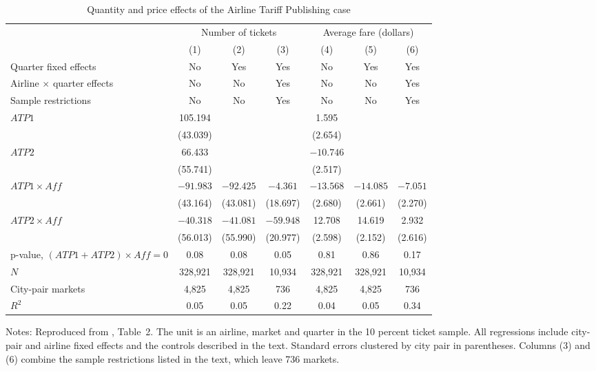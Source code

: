 \begin{table}[htbp]
\centering
\caption{Quantity and price effects of the Airline Tariff Publishing case}\label{tab:13-miller-t2}
\small
\begin{tabular}{@{}lcccccc@{}}
\toprule
 & \multicolumn{3}{c}{Number of tickets} & \multicolumn{3}{c}{Average fare (dollars)}\\
\cmidrule(lr){2-4}\cmidrule(l){5-7}
 & (1) & (2) & (3) & (4) & (5) & (6)\\
\midrule
Quarter fixed effects & No & Yes & Yes & No & Yes & Yes\\
Airline $\times$ quarter effects & No & No & Yes & No & No & Yes\\
Sample restrictions & No & No & Yes & No & No & Yes\\
\addlinespace
$\mathit{ATP1}$ & 105.194 & & & 1.595 & & \\
 & (43.039) & & & (2.654) & & \\
$\mathit{ATP2}$ & 66.433 & & & $-10.746$ & & \\
 & (55.741) & & & (2.517) & & \\
$\mathit{ATP1}\times\mathit{Aff}$ & $-91.983$ & $-92.425$ & $-4.361$ & $-13.568$ & $-14.085$ & $-7.051$\\
 & (43.164) & (43.081) & (18.697) & (2.680) & (2.661) & (2.270)\\
$\mathit{ATP2}\times\mathit{Aff}$ & $-40.318$ & $-41.081$ & $-59.948$ & 12.708 & 14.619 & 2.932\\
 & (56.013) & (55.990) & (20.977) & (2.598) & (2.152) & (2.616)\\
\addlinespace
p-value, $(\mathit{ATP1} + \mathit{ATP2})\times\mathit{Aff} = 0$ & 0.08 & 0.08 & 0.05 & 0.81 & 0.86 & 0.17\\
$N$ & 328{,}921 & 328{,}921 & 10{,}934 & 328{,}921 & 328{,}921 & 10{,}934\\
City-pair markets & 4{,}825 & 4{,}825 & 736 & 4{,}825 & 4{,}825 & 736\\
$R^2$ & 0.05 & 0.05 & 0.22 & 0.04 & 0.05 & 0.34\\
\bottomrule
\end{tabular}

\smallskip
\begin{minipage}{0.95\textwidth}\footnotesize
Notes: Reproduced from \citet{Miller2010}, Table~2. The unit is an airline, market and quarter in the
10 percent ticket sample. All regressions include city-pair and airline fixed effects and the controls described
in the text. Standard errors clustered by city pair in parentheses. Columns (3) and (6) combine the sample
restrictions listed in the text, which leave 736 markets.
\end{minipage}
\end{table}

